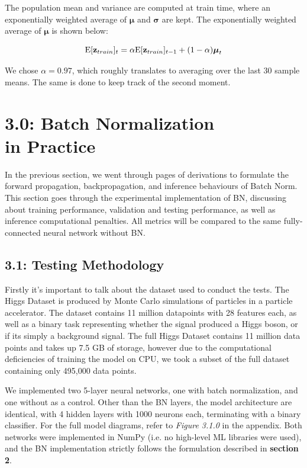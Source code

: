 \documentclass{article}
\begin{document}
\begin{multicols}{2}
The population mean and variance are computed at train time, where an 
exponentially weighted average of $\boldsymbol{\mu}$ and $\boldsymbol{\sigma}$
are kept. The exponentially weighted average of $\boldsymbol{\mu}$ is shown below:

\begin{equation}
    \text{E}[\textbf{z}_{train}]_{t} = \alpha \text{E}[\textbf{z}_{train}]_{t-1} + (1-\alpha)\boldsymbol{\mu}_t\notag
\end{equation}

We chose $\alpha = 0.97$, which roughly translates to averaging over the 
last 30 sample means. The same is done to keep track of the second moment.

\section*{3.0: Batch Normalization \\in Practice}

In the previous section, we went through pages of derivations to formulate the 
forward propagation, backpropagation, and inference behaviours of Batch Norm.
This section goes through the experimental implementation of BN, discussing
about training performance, validation and testing performance, as well as
inference computational penalties. All metrics will be compared to the same 
fully-connected neural network without BN.

\subsection*{3.1: Testing Methodology}

Firstly it's important to talk about the dataset used to conduct the tests.
The Higgs Dataset\cite{higgs} is produced 
by Monte Carlo simulations of particles in a particle accelerator. The 
dataset contains 11 million datapoints with 28 features each, as well
as a binary task representing whether the signal produced a Higgs boson, or 
if its simply a background signal. The full Higgs Dataset contains 11 million 
data points and takes up 7.5 GB of storage, however due to the computational 
deficiencies of training the model on CPU, we took a subset of the full dataset
containing only 495,000 data points.

We implemented two 5-layer neural networks, one with batch normalization, and 
one without as a control. Other than the BN layers, the model architecture are
identical, with 4 hidden layers with 1000 neurons each, terminating with a 
binary classifier. For the full model diagrams, refer to \textit{Figure 3.1.0} 
in the appendix. Both networks were implemented in NumPy (i.e. no high-level 
ML libraries were used), and the BN implementation
strictly follows the formulation described in \textbf{section 2}.


\end{multicols}
\end{document}
